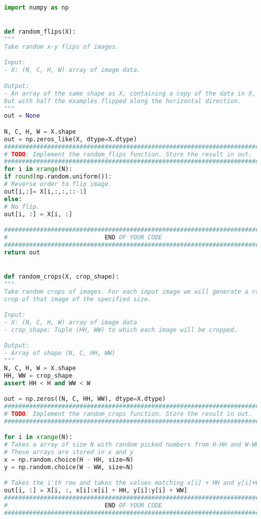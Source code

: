 \begin{lstlisting}[language=Python, label=lst:data_augmentation.py, caption={dataaug.py}, basicstyle=\tiny]
import numpy as np


def random_flips(X):
"""
Take random x-y flips of images.

Input:
- X: (N, C, H, W) array of image data.

Output:
- An array of the same shape as X, containing a copy of the data in X,
but with half the examples flipped along the horizontal direction.
"""
out = None

N, C, H, W = X.shape
out = np.zeros_like(X, dtype=X.dtype)
#############################################################################
# TODO: Implement the random_flips function. Store the result in out.       #
#############################################################################
for i in xrange(N):
if round(np.random.uniform()):
# Reverse order to flip image.
out[i,:]= X[i,:,:,::-1]
else:
# No flip.
out[i, :] = X[i, :]

#############################################################################
#                           END OF YOUR CODE                                #
#############################################################################
return out


def random_crops(X, crop_shape):
"""
Take random crops of images. For each input image we will generate a random
crop of that image of the specified size.

Input:
- X: (N, C, H, W) array of image data
- crop_shape: Tuple (HH, WW) to which each image will be cropped.

Output:
- Array of shape (N, C, HH, WW)
"""
N, C, H, W = X.shape
HH, WW = crop_shape
assert HH < H and WW < W

out = np.zeros((N, C, HH, WW), dtype=X.dtype)
#############################################################################
# TODO: Implement the random_crops function. Store the result in out.       #
#############################################################################

for i in xrange(N):
# Takes a array of size N with random picked numbers from H-HH and W-WW
# These arrays are stored in x and y
x = np.random.choice(H - HH, size=N)
y = np.random.choice(W - WW, size=N)

# Takes the i'th row and takes the values matching x[i] + HH and y[i]+WW.
out[i, :] = X[i, :, x[i]:x[i] + HH, y[i]:y[i] + WW]
#############################################################################
#                           END OF YOUR CODE                                #
#############################################################################


\end{lstlisting}
